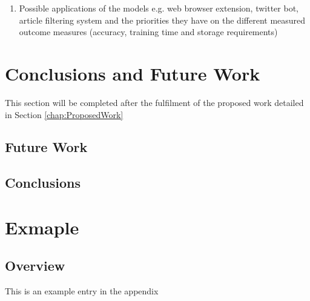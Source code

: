 \documentclass[a4paper,twoside,phd]{BYUPhys}
\begin{document}
\begin{enumerate}[-]
	\item Possible applications of the models e.g. web browser extension, twitter bot, article filtering system and the priorities they have on the different measured outcome measures (accuracy, training time and storage requirements)
\end{enumerate}

\chapter{Conclusions and Future Work}
\label{chap:Conclusions}
This section will be completed after the fulfilment of the proposed work detailed in Section \ref{chap:ProposedWork}

\section{Future Work}
\label{FutureWork}

\section{Conclusions}
\label{sec:ConclusionsConclusions}



\clearemptydoublepage


\appendix
\chapter{Exmaple}
\section{Overview}
This is an example entry in the appendix



%

%

%
\end{document}
